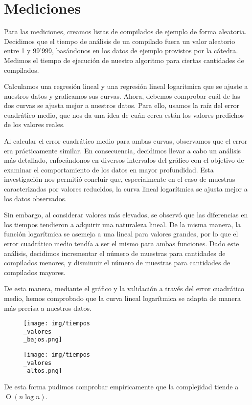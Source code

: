 \section{Mediciones}

Para las mediciones, creamos listas de compilados de ejemplo de forma aleatoria. Decidimos que el tiempo
de análisis de un compilado fuera un valor aleatorio entre 1 y 99'999, basándonos en los datos de ejemplo
provistos por la cátedra.
Medimos el tiempo de ejecución de nuestro algoritmo para ciertas cantidades de compilados.

Calculamos una regresión lineal y una regresión lineal logaritmica que se ajuste a nuestros datos y graficamos sus curvas.
Ahora, debemos comprobar cuál de las dos curvas se ajusta mejor a nuestros datos. Para ello, usamos la raíz del
error cuadrático medio, que nos da una idea de cuán cerca están los valores predichos de los valores reales.

Al calcular el error cuadrático medio para ambas curvas, observamos que el error era prácticamente similar.
En consecuencia, decidimos llevar a cabo un análisis más detallado,
enfocándonos en diversos intervalos del gráfico con el objetivo de examinar el comportamiento de los datos en mayor
profundidad. Esta investigación nos permitió concluir que, especialmente en el caso de muestras caracterizadas
por valores reducidos, la curva lineal logarítmica se ajusta mejor a los datos observados.

Sin embargo, al considerar valores más elevados, se observó que las diferencias en los tiempos tendieron a adquirir una naturaleza lineal. 
De la misma manera, la función logarítmica se asemeja a una lineal para valores grandes, por lo que el error cuadrático medio tendía a ser el mismo
para ambas funciones. Dado este análisis, decidimos incrementar el número de muestras para cantidades de compilados menores, 
y disminuir el número de muestras para cantidades de compilados mayores. 

De esta manera, mediante el gráfico y la validación a través del error cuadrático medio, hemos comprobado que la curva lineal logarítmica 
se adapta de manera más precisa a nuestros datos.


\begin{figure}[H]
    \centering
    \texttt{[image: img/tiempos\\\_valores\\\_bajos.png]}
\end{figure}

\begin{figure}[H]
    \centering
    \texttt{[image: img/tiempos\\\_valores\\\_altos.png]}
\end{figure}

De esta forma pudimos comprobar empíricamente que la complejidad tiende a $\operatorname{O}(n\log{n})$.